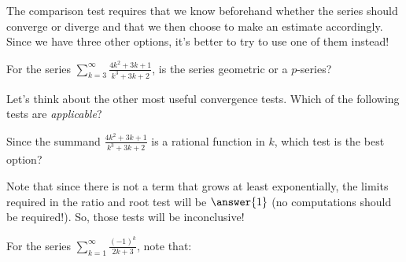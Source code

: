 \documentclass{ximera}
\begin{document}
\begin{exercise}
\begin{hint}
\begin{question}
The comparison test requires that we know beforehand whether the series should converge or diverge and that we then choose to make an estimate accordingly.  Since we have three other options, it's better to try to use one of them instead! 
\end{question}



\begin{question}
For the series $\sum_{k=3}^{\infty} \frac{4k^2+3k+1}{k^3+3k+2}$, is the series geometric or a $p$-series?

\begin{multipleChoice}
\end{multipleChoice}

Let's think about the other most useful convergence tests.  Which of the following tests are \emph{applicable}?

\begin{selectAll}
\end{selectAll}

Since the summand $  \frac{4k^2+3k+1}{k^3+3k+2}$ is a rational function in $k$, which test is the best option?
\begin{selectAll}
\end{selectAll}
Note that since there is not a term that grows at least exponentially, the limits required in the ratio and root test will be $\answer{1}$ (no computations should be required!).  So, those tests will be inconclusive!


\end{question}

\begin{question}
For the series $\sum_{k=1}^{\infty} \frac{(-1)^k}{2k+3}$, note that:

\begin{multipleChoice}
\end{multipleChoice}


\end{question}
\end{hint}
\end{exercise}
\end{document}
